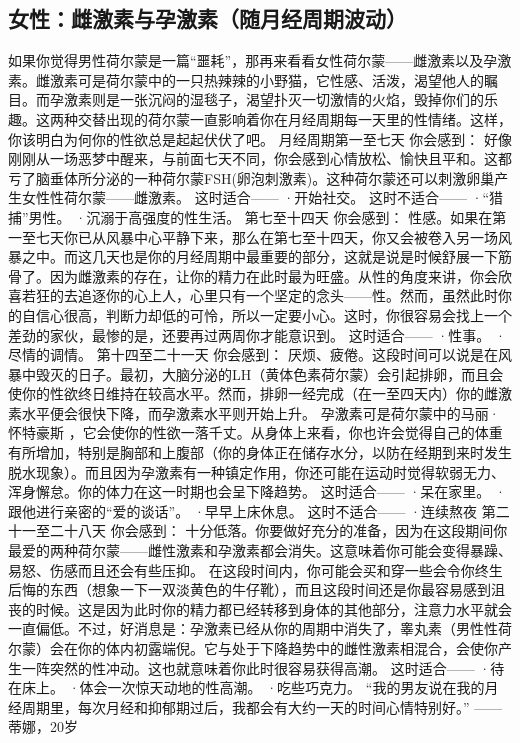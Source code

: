 \documentclass[12pt,UTF8,openany]{ctexbook}
\begin{document}
\subsection*{女性：雌激素与孕激素（随月经周期波动）}
如果你觉得男性荷尔蒙是一篇“噩耗”，那再来看看女性荷尔蒙——雌激素以及孕激素。雌激素可是荷尔蒙中的一只热辣辣的小野猫，它性感、活泼，渴望他人的瞩目。而孕激素则是一张沉闷的湿毯子，渴望扑灭一切激情的火焰，毁掉你们的乐趣。这两种交替出现的荷尔蒙一直影响着你在月经周期每一天里的性情绪。这样，你该明白为何你的性欲总是起起伏伏了吧。
月经周期第一至七天
你会感到：
好像刚刚从一场恶梦中醒来，与前面七天不同，你会感到心情放松、愉快且平和。这都亏了脑垂体所分泌的一种荷尔蒙FSH(卵泡刺激素)。这种荷尔蒙还可以刺激卵巢产生女性性荷尔蒙——雌激素。
这时适合——
·开始社交。
这时不适合——
·“猎捕”男性。
·沉溺于高强度的性生活。
第七至十四天
你会感到：
性感。如果在第一至七天你已从风暴中心平静下来，那么在第七至十四天，你又会被卷入另一场风暴之中。而这几天也是你的月经周期中最重要的部分，这就是说是时候舒展一下筋骨了。因为雌激素的存在，让你的精力在此时最为旺盛。从性的角度来讲，你会欣喜若狂的去追逐你的心上人，心里只有一个坚定的念头——性。然而，虽然此时你的自信心很高，判断力却低的可怜，所以一定要小心。这时，你很容易会找上一个差劲的家伙，最惨的是，还要再过两周你才能意识到。
这时适合——
·性事。
·尽情的调情。
第十四至二十一天
你会感到：
厌烦、疲倦。这段时间可以说是在风暴中毁灭的日子。最初，大脑分泌的LH（黄体色素荷尔蒙）会引起排卵，而且会使你的性欲终日维持在较高水平。然而，排卵一经完成（在一至四天内）你的雌激素水平便会很快下降，而孕激素水平则开始上升。
孕激素可是荷尔蒙中的马丽·怀特豪斯 ，它会使你的性欲一落千丈。从身体上来看，你也许会觉得自己的体重有所增加，特别是胸部和上腹部（你的身体正在储存水分，以防在经期到来时发生脱水现象）。而且因为孕激素有一种镇定作用，你还可能在运动时觉得软弱无力、浑身懈怠。你的体力在这一时期也会呈下降趋势。
这时适合——
·呆在家里。
·跟他进行亲密的“爱的谈话”。
·早早上床休息。
这时不适合——
·连续熬夜
第二十一至二十八天
你会感到：
十分低落。你要做好充分的准备，因为在这段期间你最爱的两种荷尔蒙——雌性激素和孕激素都会消失。这意味着你可能会变得暴躁、易怒、伤感而且还会有些压抑。
在这段时间内，你可能会买和穿一些会令你终生后悔的东西（想象一下一双淡黄色的牛仔靴），而且这段时间还是你最容易感到沮丧的时候。这是因为此时你的精力都已经转移到身体的其他部分，注意力水平就会一直偏低。不过，好消息是：孕激素已经从你的周期中消失了，睾丸素（男性性荷尔蒙）会在你的体内初露端倪。它与处于下降趋势中的雌性激素相混合，会使你产生一阵突然的性冲动。这也就意味着你此时很容易获得高潮。
这时适合——
·待在床上。
·体会一次惊天动地的性高潮。
·吃些巧克力。
“我的男友说在我的月经周期里，每次月经和抑郁期过后，我都会有大约一天的时间心情特别好。”
——蒂娜，20岁
\end{document}
